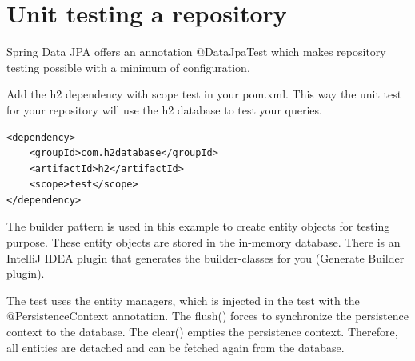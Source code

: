 \section{Unit testing a repository}

Spring Data JPA offers an annotation @DataJpaTest which makes repository testing possible with a minimum of configuration. 

Add the h2 dependency with scope test in your pom.xml. This way the unit test for your repository will use the h2 database to test your queries.

\begin{lstlisting}
<dependency>
	<groupId>com.h2database</groupId>
	<artifactId>h2</artifactId>
	<scope>test</scope>
</dependency>
\end{lstlisting}

The builder pattern is used in this example to create entity objects for testing purpose. These entity objects are stored in the in-memory database. There is an IntelliJ IDEA plugin that generates the builder-classes for you (Generate Builder plugin).

The test uses the entity managers, which is injected in the test with the @PersistenceContext annotation. The flush() forces to synchronize the persistence context to the database. The clear() empties the persistence context. Therefore, all entities are detached and can be fetched again from the database.


